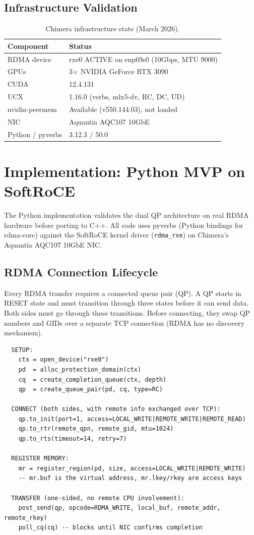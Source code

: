 \documentclass[11pt]{article}
\begin{document}
\subsection{Infrastructure Validation}

\begin{table}[h]
\centering
\caption{Chimera infrastructure state (March 2026).}
\label{tab:infra}
\begin{tabular}{ll}
\toprule
Component & Status \\
\midrule
RDMA device & rxe0 ACTIVE on enp69s0 (10Gbps, MTU 9000) \\
GPUs & 3$\times$ NVIDIA GeForce RTX 3090 \\
CUDA & 12.4.131 \\
UCX & 1.16.0 (verbs, mlx5-dv, RC, DC, UD) \\
nvidia-peermem & Available (v550.144.03), not loaded \\
NIC & Aquantia AQC107 10GbE \\
Python / pyverbs & 3.12.3 / 50.0 \\
\bottomrule
\end{tabular}
\end{table}

\section{Implementation: Python MVP on SoftRoCE}

The Python implementation validates the dual QP architecture on real RDMA hardware before porting to C++. All code uses pyverbs (Python bindings for rdma-core) against the SoftRoCE kernel driver (\texttt{rdma\_rxe}) on Chimera's Aquantia AQC107 10GbE NIC.

\subsection{RDMA Connection Lifecycle}

Every RDMA transfer requires a connected queue pair (QP). A QP starts in RESET state and must transition through three states before it can send data. Both sides must go through these transitions. Before connecting, they swap QP numbers and GIDs over a separate TCP connection (RDMA has no discovery mechanism).

\begin{verbatim}
  SETUP:
    ctx = open_device("rxe0")
    pd  = alloc_protection_domain(ctx)
    cq  = create_completion_queue(ctx, depth)
    qp  = create_queue_pair(pd, cq, type=RC)

  CONNECT (both sides, with remote info exchanged over TCP):
    qp.to_init(port=1, access=LOCAL_WRITE|REMOTE_WRITE|REMOTE_READ)
    qp.to_rtr(remote_qpn, remote_gid, mtu=1024)
    qp.to_rts(timeout=14, retry=7)

  REGISTER MEMORY:
    mr = register_region(pd, size, access=LOCAL_WRITE|REMOTE_WRITE)
    -- mr.buf is the virtual address, mr.lkey/rkey are access keys

  TRANSFER (one-sided, no remote CPU involvement):
    post_send(qp, opcode=RDMA_WRITE, local_buf, remote_addr, remote_rkey)
    poll_cq(cq) -- blocks until NIC confirms completion
\end{verbatim}
\end{document}

